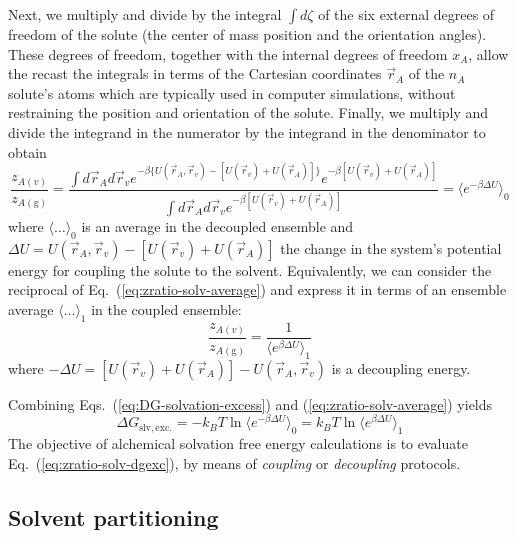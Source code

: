 \documentclass[9pt,bestpractices,pubversion]{livecoms}
\begin{document}
Next, we multiply and divide by the integral $\int d\zeta$ of the six external degrees of freedom of the solute (the center of mass position and the orientation angles). These degrees of freedom, together with the internal degrees of freedom $x_A$, allow the recast the integrals in terms of the Cartesian coordinates $\vec{r}_A$ of the $n_A$ solute's atoms which are typically used in computer simulations, without restraining the position and orientation of the solute. Finally, we multiply and divide the integrand in the numerator by the integrand in the denominator to obtain
\begin{equation}
  \frac{z_{A(v)}}{z_{A(\mathrm{g})}} =
  \frac{
    \int d\vec{r}_A  d\vec{r}_v  e^{-\beta \{ U(\vec{r}_A, \vec{r}_v) -  [ U(\vec{r}_v) + U(\vec{r}_A) ] \}} e^{-\beta [U(\vec{r}_v) + U(  \vec{r}_A  )] } 
  }{
    \int d\vec{r}_A d\vec{r}_v e^{-\beta [U(\vec{r}_v) + U( \vec{r}_A  )] } 
  } = \langle e^{-\beta \Delta U} \rangle_0
  \label{eq:zratio-solv-average}
\end{equation}
where $\langle \ldots \rangle_0$ is an average in the decoupled ensemble and $\Delta U =  U(\vec{r}_A , \vec{r}_v) -  [ U(\vec{r}_v) + U(\vec{r}_A ) ]$ the change in the system's potential energy for coupling the solute to the solvent. Equivalently, we can consider the reciprocal of Eq.~(\ref{eq:zratio-solv-average}) and express it in terms of an ensemble average $\langle \ldots \rangle_1$ in the coupled ensemble:
\begin{equation}
  \frac{z_{A(v)}}{z_{A(\mathrm{g})}} = \frac{1}{\langle e^{\beta \Delta U} \rangle_1}
\end{equation}
where $-\Delta U = [ U(\vec{r}_v) + U(\vec{r}_A ) ] - U(\vec{r}_A , \vec{r}_v)$ is a decoupling energy.

Combining Eqs.~(\ref{eq:DG-solvation-excess}) and (\ref{eq:zratio-solv-average}) yields\cite{widom1982potential} 
\begin{equation}
  \Delta G_{\mathrm{slv, exc.}} = - k_B T \ln \langle e^{-\beta \Delta U} \rangle_0 = k_B T \ln \langle e^{\beta \Delta U} \rangle_1
  \label{eq:zratio-solv-dgexc}
\end{equation}
The objective of alchemical solvation free energy calculations is to evaluate Eq.~(\ref{eq:zratio-solv-dgexc}), by means of \emph{coupling} or \emph{decoupling} protocols.
  
\subsection{Solvent partitioning}
\end{document}
